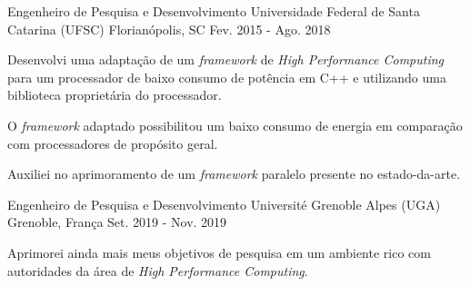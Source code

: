 

\begin{cventries}

  \cventry
    {Engenheiro de Pesquisa e Desenvolvimento} %
    {Universidade Federal de Santa Catarina (UFSC)} %
    {Florianópolis, SC} %
    {Fev. 2015 - Ago. 2018} %
    {
      \begin{cvitems} %
      \item {Desenvolvi uma adaptação de um \textit{framework} de \textit{High
        Performance Computing} para um processador de baixo consumo de potência
          em C++ e utilizando uma biblioteca proprietária do processador.}
        \item {O \textit{framework} adaptado possibilitou um baixo consumo de
          energia em comparação com processadores de propósito geral.}
        \item {Auxiliei no aprimoramento de um \textit{framework}
          paralelo presente no estado-da-arte.}
      \end{cvitems}
    }

  \cventry
    {Engenheiro de Pesquisa e Desenvolvimento} %
    {Université Grenoble Alpes (UGA)} %
    {Grenoble, França} %
    {Set. 2019 - Nov. 2019} %
    {
      \begin{cvitems} %
      \item {Aprimorei ainda mais meus objetivos de pesquisa em um ambiente rico
        com autoridades da área de \textit{High Performance Computing}.}
      \end{cvitems}
    }


\end{cventries}
